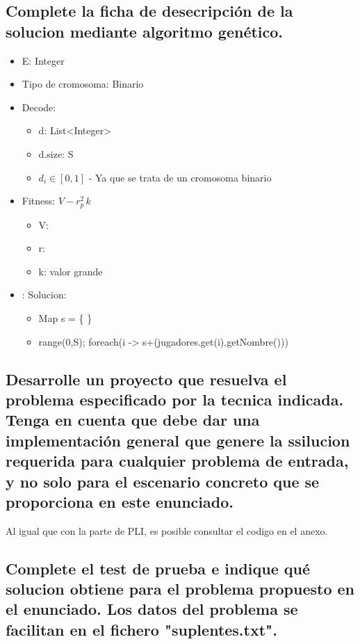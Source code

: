 \documentclass[a4paper,12pt]{article}
\begin{document}
\subsection{Complete la ficha de desecripción de la solucion mediante algoritmo genético.}

\begin{itemize}
  \item E: Integer
  \item Tipo de cromosoma: Binario
  \item Decode:
  \begin{itemize}
    \item d: List\textless Integer\textgreater
    \item d.size: S
    \item $ d_i \in [0,1] $ - Ya que se trata de un cromosoma binario
  \end{itemize}
  \item Fitness: $V - r_p^2 \,k$
  \begin{itemize}
    \item V:
    \item r:
    \item k: valor grande
  \end{itemize}
  \item: Solucion:
  \begin{itemize}
    \item Map s = \{ \}
    \item range(0,S); foreach(i -> s+(jugadores.get(i).getNombre()))
  \end{itemize}
\end{itemize}



\subsection{Desarrolle un proyecto que resuelva el problema especificado por la tecnica indicada. Tenga en cuenta que debe dar una implementación general que genere la ssilucion requerida para cualquier problema de entrada, y no solo para el escenario concreto que se proporciona en este enunciado.}
Al igual que con la parte de PLI, es posible consultar el codigo en el anexo.
\subsection{Complete el test de prueba e indique qué solucion obtiene para el problema propuesto en el enunciado. Los datos del problema se facilitan en el fichero "suplentes.txt".}
\end{document}

